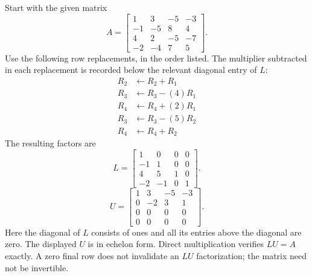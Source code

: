 Start with the given matrix
\[A=\left[\begin{matrix}1 & 3 & -5 & -3\\-1 & -5 & 8 & 4\\4 & 2 & -5 & -7\\-2 & -4 & 7 & 5\end{matrix}\right].\]
Use the following row replacements, in the order listed. The multiplier
subtracted in each replacement is recorded below the relevant diagonal
entry of $L$:
\begin{align*}R_{2}&\leftarrow R_{2}+R_{1}\\
R_{3}&\leftarrow R_{3}-(4)R_{1}\\
R_{4}&\leftarrow R_{4}+(2)R_{1}\\
R_{3}&\leftarrow R_{3}-(5)R_{2}\\
R_{4}&\leftarrow R_{4}+R_{2}\end{align*}The resulting factors are
\[L=\left[\begin{matrix}1 & 0 & 0 & 0\\-1 & 1 & 0 & 0\\4 & 5 & 1 & 0\\-2 & -1 & 0 & 1\end{matrix}\right].\]
\[U=\left[\begin{matrix}1 & 3 & -5 & -3\\0 & -2 & 3 & 1\\0 & 0 & 0 & 0\\0 & 0 & 0 & 0\end{matrix}\right].\]Here the diagonal of $L$ consists of ones and all its entries above
the diagonal are zero. The displayed $U$ is in echelon form.
Direct multiplication verifies $LU=A$ exactly. A zero final row does not
invalidate an $LU$ factorization; the matrix need not be invertible.

